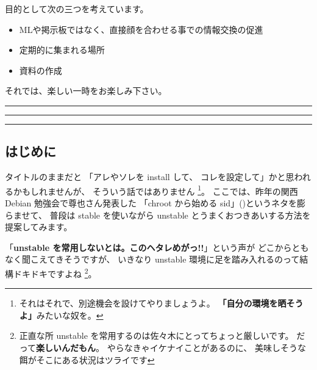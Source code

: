 \documentclass[mingoth,a4paper]{jsarticle}
\newcommand{\hcite}[1]{(\citealt{#1})}
\begin{document}
 目的として次の三つを考えています。
 \begin{itemize}
  \item MLや掲示板ではなく、直接顔を合わせる事での情報交換の促進
  \item 定期的に集まれる場所
  \item 資料の作成
 \end{itemize}

 それでは、楽しい一時をお楽しみ下さい。

\newpage

\begin{minipage}[b]{0.2\hsize}
 {}
\end{minipage}
\begin{minipage}[b]{0.8\hsize}
\hrule
\vspace{2mm}
\hrule
\setcounter{tocdepth}{1}
\tableofcontents
\vspace{2mm}
\hrule
\end{minipage}




\subsection{はじめに}

タイトルのままだと
「アレやソレを install して、 コレを設定して」かと思われるかもしれませんが、
そういう話ではありません%
\footnote{%
それはそれで、別途機会を設けてやりましょうよ。%
{\bf「自分の環境を晒そうよ」}みたいな奴を。}。
ここでは、昨年の関西 Debian 勉強会で尊也さん発表した
「chroot から始める sid」\hcite{山下2008}というネタを膨らませて、
普段は stable を使いながら 
unstable とうまくおつきあいする方法を提案してみます。

「{\bf unstable を常用しないとは。このヘタレめがっ!!}」という声が
どこからともなく聞こえてきそうですが、
いきなり unstable 環境に足を踏み入れるのって結構ドキドキですよね%
\footnote{%
正直な所 unstable を常用するのは佐々木にとってちょっと厳しいです。
だって{\bf 楽しいんだもん}。
やらなきゃイケナイことがあるのに、
美味しそうな餌がそこにある状況はツライです}。
\end{document}
